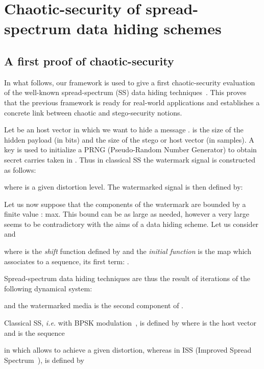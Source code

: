 \documentclass{llncs}
\begin{document}
\section{Chaotic-security of spread-spectrum data hiding schemes}
\label{SS}

\subsection{A first proof of chaotic-security}
\label{spread}






In what follows, our framework is used to give a first chaotic-security evaluation of the well-known spread-spectrum (SS) data hiding techniques~\cite{Cayre2008}. This proves that the previous framework is ready for real-world applications and establishes a concrete link between chaotic and stego-security notions.

\medskip

Let  be an host vector in which we want to hide a message .  is the size of the hidden payload (in bits) and  the size of the stego or host vector (in samples). A key  is used to initialize a PRNG (Pseudo-Random Number Generator) to obtain  secret carries  taken in . Thus in classical SS the watermark signal  is constructed as follows:


\noindent where  is a given distortion level. The watermarked signal  is then defined by:


Let us now suppose that the components of the watermark are bounded by a finite value : max. This bound can be as large as needed, however a very large  seems to be contradictory with the aims of a data hiding scheme.
Let us consider  and


\noindent where  is the \emph{shift} function defined by  and the \emph{initial function}  is the map which associates to a sequence, its first term: .


Spread-spectrum data hiding techniques are thus the result of  iterations of the following dynamical system:


\noindent and the watermarked media is the second component of .

Classical SS, \emph{i.e.} with BPSK modulation~\cite{Cayre2008}, is defined by  where  is the host vector  and  is the sequence 


\noindent in which  allows to achieve a given distortion, whereas in ISS (Improved Spread Spectrum~\cite{Malvar03}),  is defined by
\end{document}
